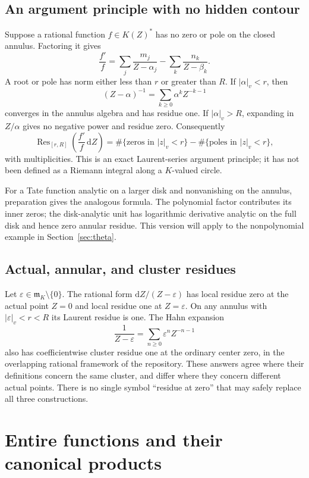 \documentclass[11pt,a4paper]{article}
\numberwithin{equation}{section}
\theoremstyle{definition}
\theoremstyle{remark}
\newcommand{\mm}{\mathfrak m}
\newcommand{\vabs}[1]{\lvert#1\rvert_v}
\newcommand{\Res}{\operatorname{Res}}
\newcommand{\dd}{\,\mathrm d}
\begin{document}
\subsection{An argument principle with no hidden contour}
Suppose a rational function $f\in K(Z)^*$ has no zero or pole on the closed
annulus. Factoring it gives
\[
 \frac{f'}f=
 \sum_j\frac{m_j}{Z-\alpha_j}
 -\sum_k\frac{n_k}{Z-\beta_k}.
\]
A root or pole has norm either less than $r$ or greater than $R$. If
$\vabs\alpha<r$, then
\[
 (Z-\alpha)^{-1}=\sum_{k\ge0}\alpha^kZ^{-k-1}
\]
converges in the annulus algebra and has residue one. If $\vabs\alpha>R$,
expanding in $Z/\alpha$ gives no negative power and residue zero. Consequently
\begin{equation}\label{eq:argument}
 \Res_{[r,R]}\left(\frac{f'}f\dd Z\right)
 =\#\{\text{zeros in }\vabs z<r\}
  -\#\{\text{poles in }\vabs z<r\},
\end{equation}
with multiplicities. This is an exact Laurent-series argument principle; it
has not been defined as a Riemann integral along a $K$-valued circle.

For a Tate function analytic on a larger disk and nonvanishing on the annulus,
preparation gives the analogous formula. The polynomial factor contributes
its inner zeros; the disk-analytic unit has logarithmic derivative analytic on
the full disk and hence zero annular residue. This version will apply to the
nonpolynomial example in Section~\ref{sec:theta}.

\subsection{Actual, annular, and cluster residues}
Let $\varepsilon\in\mm_K\setminus\{0\}$. The rational form
$\mathrm dZ/(Z-\varepsilon)$ has local residue zero at the actual point $Z=0$
and local residue one at $Z=\varepsilon$. On any annulus with
$\vabs\varepsilon<r<R$ its Laurent residue is one. The Hahn expansion
\[
 \frac1{Z-\varepsilon}
 =\sum_{n\ge0}\varepsilon^nZ^{-n-1}
\]
also has coefficientwise cluster residue one at the ordinary center zero, in
the overlapping rational framework of the repository. These answers agree
where their definitions concern the same cluster, and differ where they concern
different actual points. There is no single symbol ``residue at zero'' that
may safely replace all three constructions.

\section{Entire functions and their canonical products}
\label{sec:entire}
\end{document}
